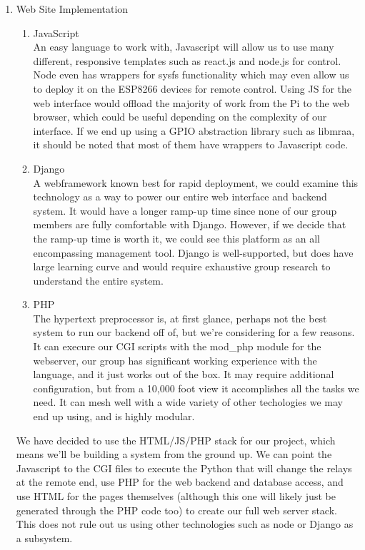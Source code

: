 \documentclass[12pt]{article}
\begin{document}
\begin{enumerate}
    \item Web Site Implementation
        \begin{enumerate}
            \item JavaScript \\
            An easy language to work with, Javascript will allow us to use many different, responsive templates such as react.js and node.js for control. Node even has wrappers for sysfs functionality which may even allow us to deploy it on the ESP8266 devices for remote control. Using JS for the web interface would offload the majority of work from the Pi to the web browser, which could be useful depending on the complexity of our interface. If we end up using a GPIO abstraction library such as libmraa, it should be noted that most of them have wrappers to Javascript code.
            \item Django \\
            A webframework known best for rapid deployment, we could examine this technology as a way to power our entire web interface and backend system. It would have a longer ramp-up time since none of our group members are fully comfortable with Django. However, if we decide that the ramp-up time is worth it, we could see this platform as an all encompassing management tool. Django is well-supported, but does have large learning curve and would require exhaustive group research to understand the entire system. 
            \item PHP \\
            The hypertext preprocessor is, at first glance, perhaps not the best system to run our backend off of, but we're considering for a few reasons. It can execure our CGI scripts with the mod\_php module for the webserver, our group has significant working experience with the language, and it just works out of the box. It may require additional configuration, but from a 10,000 foot view it accomplishes all the tasks we need. It can mesh well with a wide variety of other techologies we may end up using, and is highly modular.
        \end{enumerate}
        We have decided to use the HTML/JS/PHP stack for our project, which means we'll be building a system from the ground up. We can point the Javascript to the CGI files to execute the Python that will change the relays at the remote end, use PHP for the web backend and database access, and use HTML for the pages themselves (although this one will likely just be generated through the PHP code too) to create our full web server stack. This does not rule out us using other technologies such as node or Django as a subsystem.

\end{enumerate}
\end{document}
